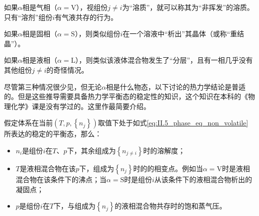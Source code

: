 \documentclass[main.tex]{subfiles}
\begin{document}
如果$\alpha$相是气相（$\alpha=\text{V}$），视组份$j\neq i$为“溶质”，就可以称其为“非挥发”的溶质。只有“溶剂”组份$i$有气液共存的行为。

如果$\alpha$相是固相（$\alpha=\text{S}$），则类似组份$i$在一个溶液中“析出”其晶体（或称“重结晶”）。

如果$\alpha$相是液相（$\alpha=\text{L}$），则类似该液体混合物发生了“分层”，且有一相几乎没有其他组份$j\neq i$的奇怪情况。

尽管第三种情况很少见，但无论$\alpha$相是什么物态，以下讨论的热力学结论是普适的。但是这些推导需要具备热力学平衡态的稳定性的知识，这个知识在本科的《物理化学》课是没有学过的。这里作最简要介绍。

假定体系在当前$\left(T,p,\left\{n_j\right\}\right)$取值下处于如式\eqref{eq:II.5_phase_eq_non_volatile}所表达的稳定的平衡态，那么：
\begin{itemize}
    \item $n_i$是组份$i$在$T$、$p$下，其余组成为$\left\{n_{j\neq i}\right\}$时的溶解度；
    \item $T$是液相混合物在该$p$下，组成为$\left\{n_j\right\}$时的的相变点。例如当$\alpha=\text{V}$时是液相混合物在该条件下的沸点；当$\alpha=\text{S}$时是组份$i$从该条件下的液相混合物析出的凝固点；
    \item $p$是组份$i$在$T$下，与组成为$\left\{n_j\right\}$的液相混合物共存时的饱和蒸气压。
\end{itemize}
\end{document}
